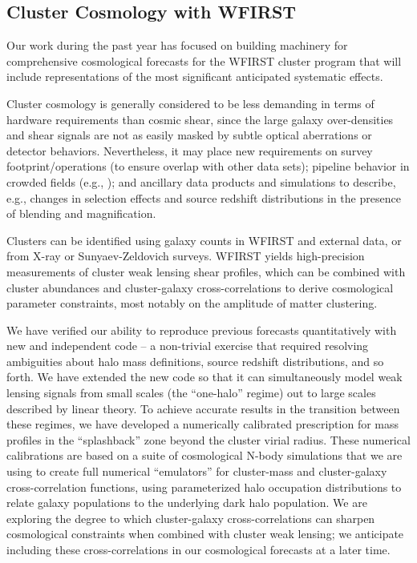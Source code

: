 \subsection{Cluster Cosmology with WFIRST}

\begin{summaryii}
Our work during the past year has focused on building machinery
for comprehensive cosmological forecasts for the WFIRST cluster
program that will include representations of the most significant
anticipated systematic effects.
\end{summaryii}

Cluster cosmology is generally considered to be less demanding in terms of
hardware requirements than cosmic shear, since the large galaxy over-densities
and shear signals are not as easily masked by subtle optical aberrations or
detector behaviors. Nevertheless, it may place new requirements on survey
footprint/operations (to ensure overlap with other data sets); pipeline behavior
in crowded fields (e.g., \cite{2015MNRAS.449.1259S}); and ancillary data
products and simulations to describe, e.g., changes in selection effects and
source redshift distributions in the presence of blending and magnification.

 Clusters can be identified
 using galaxy counts in WFIRST and external data, or from X-ray or
 Sunyaev-Zeldovich surveys.  WFIRST yields high-precision measurements of
 cluster weak lensing shear profiles, which can be combined with cluster
 abundances and cluster-galaxy cross-correlations to derive cosmological
 parameter constraints, most notably on the amplitude of matter clustering.

We have verified our ability to reproduce previous forecasts quantitatively with
new and independent code -- a non-trivial exercise that required resolving
ambiguities about halo mass definitions, source redshift distributions, and so
forth. We have extended the new code so that it can simultaneously model weak
lensing signals from small scales (the ``one-halo'' regime) out to large scales
described by linear theory. To achieve accurate results in the transition
between these regimes, we have developed a numerically calibrated prescription
for mass profiles in the ``splashback'' zone beyond the cluster virial radius.
These numerical calibrations are based on a suite of cosmological N-body
simulations that we are using to create full numerical ``emulators'' for
cluster-mass and cluster-galaxy cross-correlation functions, using parameterized
halo occupation distributions to relate galaxy populations to the underlying
dark halo population. We are exploring the degree to which cluster-galaxy
cross-correlations can sharpen cosmological constraints when combined with
cluster weak lensing; we anticipate including these cross-correlations in our
cosmological forecasts at a later time.

